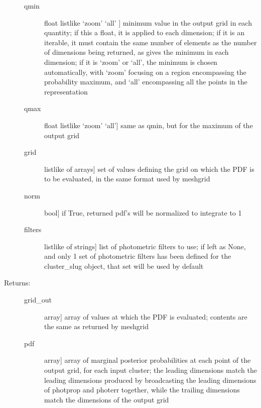 \documentclass[letterpaper,10pt,english]{sphinxmanual}
\begin{document}
\begin{fulllineitems}
\begin{fulllineitems}
\begin{description}
\begin{description}
\item[{qmin}] \leavevmode{[}float \textbar{} listlike \textbar{} ‘zoom’ \textbar{} ‘all’ {]}
minimum value in the output grid in each quantity; if
this a float, it is applied to each dimension; if it is
an iterable, it must contain the same number of elements
as the number of dimensions being returned, as gives the
minimum in each dimension; if it is ‘zoom’ or ‘all’, the
minimum is chosen automatically, with ‘zoom’ focusing on
a region encompassing the probability maximum, and ‘all’
encompassing all the points in the representation

\item[{qmax}] \leavevmode{[}float \textbar{} listlike \textbar{} ‘zoom’ \textbar{} ‘all’{]}
same as qmin, but for the maximum of the output grid

\item[{grid}] \leavevmode{[}listlike of arrays{]}
set of values defining the grid on which the PDF is to
be evaluated, in the same format used by meshgrid

\item[{norm}] \leavevmode{[}bool{]}
if True, returned pdf’s will be normalized to integrate
to 1

\item[{filters}] \leavevmode{[}listlike of strings{]}
list of photometric filters to use; if left as None, and
only 1 set of photometric filters has been defined for
the cluster\_slug object, that set will be used by
default

\end{description}

\item[{Returns:}] \leavevmode\begin{description}
\item[{grid\_out}] \leavevmode{[}array{]}
array of values at which the PDF is evaluated; contents
are the same as returned by meshgrid

\item[{pdf}] \leavevmode{[}array{]}
array of marginal posterior probabilities at each point
of the output grid, for each input cluster; the leading
dimensions match the leading dimensions produced by
broadcasting the leading dimensions of photprop and
photerr together, while the trailing dimensions match
the dimensions of the output grid

\end{description}

\end{description}


\end{fulllineitems}
\end{fulllineitems}
\end{document}
